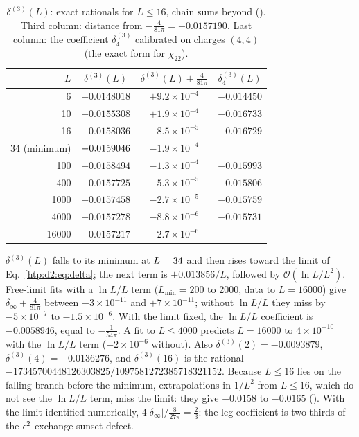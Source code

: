 \begin{table}[ht]
\centering\footnotesize\renewcommand{\arraystretch}{1.15}
\begin{tabular}{@{}rccc@{}}
\toprule
$L$ & $\delta^{(3)}(L)$ & $\delta^{(3)}(L)+\frac4{81\pi}$ & $\delta^{(3)}_4(L)$ \\\midrule
6 & $-0.0148018$ & $+9.2\times10^{-4}$ & $-0.014450$ \\
10 & $-0.0155308$ & $+1.9\times10^{-4}$ & $-0.016733$ \\
16 & $-0.0158036$ & $-8.5\times10^{-5}$ & $-0.016729$ \\
34 (minimum) & $-0.0159046$ & $-1.9\times10^{-4}$ & \\
100 & $-0.0158494$ & $-1.3\times10^{-4}$ & $-0.015993$ \\
400 & $-0.0157725$ & $-5.3\times10^{-5}$ & $-0.015806$ \\
1000 & $-0.0157458$ & $-2.7\times10^{-5}$ & $-0.015759$ \\
4000 & $-0.0157278$ & $-8.8\times10^{-6}$ & $-0.015731$ \\
16000 & $-0.0157217$ & $-2.7\times10^{-6}$ & \\
\bottomrule
\end{tabular}
\caption{$\delta^{(3)}(L)$: exact rationals for $L\le16$, chain sums beyond ().
Third column: distance from $-\frac4{81\pi}=-0.0157190$. Last column: the coefficient $\delta^{(3)}_4$ calibrated on charges $(4,4)$ (the
exact form for $\chi_{22}$).}
\label{htp:d2:tab:delta3}
\end{table}

$\delta^{(3)}(L)$ falls to its minimum at $L=34$ and then rises toward the limit of Eq.~\eqref{htp:d2:eq:delta}; the
next term is $+0.013856/L$, followed by $\mathcal O(\ln L/L^2)$. Free-limit fits with a $\ln L/L$ term ($L_{\min}=200$ to
2000, data to $L=16000$) give $\delta_\infty+\frac4{81\pi}$ between $-3\times10^{-11}$ and $+7\times10^{-11}$; without $\ln
L/L$ they miss by $-5\times10^{-7}$ to $-1.5\times10^{-6}$. With the limit fixed, the $\ln L/L$ coefficient is $-0.0058946$,
equal to $-\frac1{54\pi}$. A fit to $L\le4000$ predicts $L=16000$ to $4\times10^{-10}$ with the $\ln L/L$ term
($-2\times10^{-6}$ without). Also $\delta^{(3)}(2)=-0.0093879$, $\delta^{(3)}(4)=-0.0136276$, and $\delta^{(3)}(16)$ is the
rational $-17345700448126303825/1097581272385718321152$. Because $L\le16$ lies on the falling branch before the minimum,
extrapolations in $1/L^2$ from $L\le16$, which do not see the $\ln L/L$ term, miss the limit: they give $-0.0158$ to $-0.0165$
(). With the limit identified numerically,
$4|\delta_\infty|/\frac8{27\pi}=\frac23$: the leg coefficient is two thirds of the $\epsilon^2$ exchange-sunset defect.

